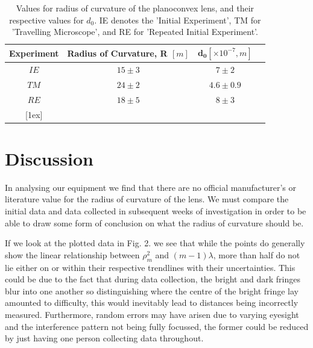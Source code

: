 \documentclass[twocolumn]{revtex4}
\newcommand{\squeezeup}{\vspace{-2.5mm}}
\begin{document}
\squeezeup
\squeezeup
\squeezeup

\begin{table}[h!]
\centering
\begin{tabular}{ |c|c|c|c| } 
 \hline
 \textbf{Experiment} & \textbf{Radius of Curvature, R $[m]$} & $\boldsymbol{d_0} [\times10^{-7}, m]$ \\ [0.5ex] 
 \hline\hline
 $IE$ &$15\pm3$ & $7\pm2$ \\ 
 $TM$ & $24\pm2$ & $4.6\pm0.9$ \\
 $RE$ & $18\pm5$ & $8\pm3$ \\
 [1ex] 
 
 \hline
\end{tabular}
\caption{Values for radius of curvature of the planoconvex lens, and their respective values for $d_0$. IE denotes the 'Initial Experiment', TM for 'Travelling Microscope', and RE for 'Repeated Initial Experiment'.}
\label{table:1}
\end{table}
\squeezeup
\squeezeup
\squeezeup

\vspace{-3ex}
\section{Discussion}
\vspace{-2ex}
In analysing our equipment we find that there are no official manufacturer's or literature value for the radius of curvature of the lens. We must compare the initial data and data collected in subsequent weeks of investigation in order to be able to draw some form of conclusion on what the radius of curvature should be. 

If we look at the plotted data in Fig. 2. we see that while the points do generally show the linear relationship between $\rho_m^2$ and $(m-1)\lambda$, more than half do not lie either on or within their respective trendlines with their uncertainties. This could be due to the fact that during data collection, the bright and dark fringes blur into one another so distinguishing where the centre of the bright fringe lay amounted to difficulty, this would inevitably lead to distances being incorrectly measured. Furthermore, random errors may have arisen due to varying eyesight and the interference pattern not being fully focussed, the former could be reduced by just having one person collecting data throughout. 
\end{document}
